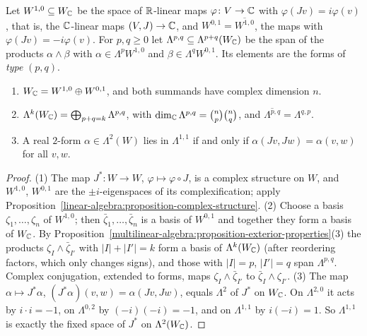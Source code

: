 \begin{definition}\label{multilinear-algebra:definition-pq}
Let $W^{1,0} \subseteq W_{\mathbb{C}}$ be the space of $\mathbb{R}$-linear maps $\varphi \colon V \to \mathbb{C}$ with $\varphi(Jv) = i\varphi(v)$, that is, the
$\mathbb{C}$-linear maps $(V, J) \to \mathbb{C}$, and $W^{0,1} = \overline{W^{1,0}}$, the maps with $\varphi(Jv) = -i\varphi(v)$. For
$p, q \geq 0$ let $\Lambda^{p,q} \subseteq \Lambda^{p+q}(W_{\mathbb{C}})$ be the span of the products $\alpha \wedge \beta$ with
$\alpha \in \Lambda^p W^{1,0}$ and $\beta \in \Lambda^q W^{0,1}$. Its elements are the forms of \emph{type} $(p, q)$.
\end{definition}

\begin{proposition}\label{multilinear-algebra:proposition-pq-decomposition}
\begin{enumerate}
\item $W_{\mathbb{C}} = W^{1,0} \oplus W^{0,1}$, and both summands have complex dimension $n$.
\item $\Lambda^k(W_{\mathbb{C}}) = \bigoplus_{p+q=k}\Lambda^{p,q}$, with $\dim_{\mathbb{C}} \Lambda^{p,q} = \binom{n}{p}\binom{n}{q}$, and
$\overline{\Lambda^{p,q}} = \Lambda^{q,p}$.
\item A real $2$-form $\alpha \in \Lambda^2(W)$ lies in $\Lambda^{1,1}$ if and only if $\alpha(Jv, Jw) = \alpha(v, w)$ for all $v, w$.
\end{enumerate}
\end{proposition}

\begin{proof}
(1) The map $J^* \colon W \to W$, $\varphi \mapsto \varphi \circ J$, is a complex structure on $W$, and $W^{1,0}$, $W^{0,1}$ are the
$\pm i$-eigenspaces of its complexification; apply Proposition~\ref{linear-algebra:proposition-complex-structure}.
(2) Choose a basis $\zeta_1, \ldots, \zeta_n$ of $W^{1,0}$; then $\bar\zeta_1, \ldots, \bar\zeta_n$ is a basis of $W^{0,1}$ and together
they form a basis of $W_{\mathbb{C}}$. By Proposition~\ref{multilinear-algebra:proposition-exterior-properties}(3) the products
$\zeta_I \wedge \bar\zeta_{I'}$ with $|I| + |I'| = k$ form a basis of $\Lambda^k(W_{\mathbb{C}})$ (after reordering factors, which only changes
signs), and those with $|I| = p$, $|I'| = q$ span $\Lambda^{p,q}$. Complex conjugation, extended to forms, maps
$\zeta_I \wedge \bar\zeta_{I'}$ to $\bar\zeta_I \wedge \zeta_{I'}$.
(3) The map $\alpha \mapsto J^*\alpha$, $(J^*\alpha)(v, w) = \alpha(Jv, Jw)$, equals $\Lambda^2$ of $J^*$ on $W_{\mathbb{C}}$. On $\Lambda^{2,0}$ it acts by
$i \cdot i = -1$, on $\Lambda^{0,2}$ by $(-i)(-i) = -1$, and on $\Lambda^{1,1}$ by $i(-i) = 1$. So $\Lambda^{1,1}$ is exactly the fixed space of
$J^*$ on $\Lambda^2(W_{\mathbb{C}})$.
\end{proof}

